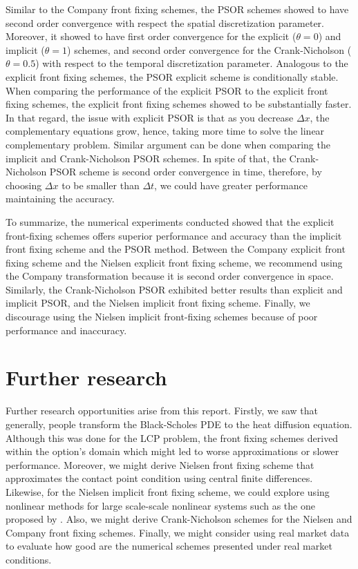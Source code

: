 Similar to the Company front fixing schemes, the PSOR schemes showed to have second order convergence with respect the spatial discretization parameter. Moreover, it showed to have first order convergence for the explicit ($\theta=0$) and implicit ($\theta=1$) schemes, and second order convergence for the Crank-Nicholson ($\theta=0.5$) with respect to the temporal discretization parameter. Analogous to the explicit front fixing schemes, the PSOR explicit scheme is conditionally stable. When comparing the performance of the explicit PSOR to the explicit front fixing schemes, the explicit front fixing schemes showed to be substantially faster. In that regard, the issue with explicit PSOR is that as you decrease $\Delta{x}$, the complementary equations grow, hence, taking more time to solve the linear complementary problem. Similar argument can be done when comparing the implicit and Crank-Nicholson PSOR schemes. In spite of that, the Crank-Nicholson PSOR scheme is second order convergence in time, therefore, by choosing $\Delta{x}$ to be smaller than $\Delta{t}$, we could have greater performance maintaining the accuracy. 

To summarize, the numerical experiments conducted showed that the explicit front-fixing schemes offers superior performance and accuracy than the implicit front fixing scheme and the PSOR method. Between the Company explicit front fixing scheme and the Nielsen explicit front fixing scheme, we recommend using the Company transformation because it is second order convergence in space. Similarly, the Crank-Nicholson PSOR exhibited better results than explicit and implicit PSOR, and the Nielsen implicit front fixing scheme. Finally, we discourage using the Nielsen implicit front-fixing schemes because of poor performance and inaccuracy.

\section{Further research}

Further research opportunities arise from this report. Firstly, we saw that generally, people transform the Black-Scholes PDE to the heat diffusion equation. Although this was done for the LCP problem, the front fixing schemes derived within the option's domain which might led to worse approximations or slower performance. Moreover, we might derive Nielsen front fixing scheme that approximates the contact point condition using central finite differences. Likewise, for the Nielsen implicit front fixing scheme, we could explore using nonlinear methods for large scale-scale nonlinear systems such as the one proposed by \cite{lacruz_2006}. Also, we might derive Crank-Nicholson schemes for the Nielsen and Company front fixing schemes. Finally, we might consider using real market data to evaluate how good are the numerical schemes presented under real market conditions.
